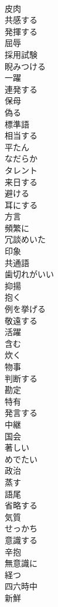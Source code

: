 \documentclass[8pt]{extreport}
\begin{document}
\begin{CJK}{UTF8}{min}
\\	皮肉
\\	共感する
\\	発揮する
\\	屈辱
\\	採用試験
\\	睨みつける
\\	一躍
\\	連発する
\\	保母
\\	偽る
\\	標準語
\\	相当する
\\	平たん
\\	なだらか
\\	タレント
\\	来日する
\\	避ける
\\	耳にする
\\	方言
\\	頻繁に
\\	冗談めいた
\\	印象
\\	共通語
\\	歯切れがいい
\\	抑揚
\\	抱く
\\	例を挙げる
\\	敬遠する
\\	活躍
\\	含む
\\	炊く
\\	物事
\\	判断する
\\	勘定
\\	特有
\\	発言する
\\	中継
\\	国会
\\	著しい
\\	めでたい
\\	政治
\\	蒸す
\\	語尾
\\	省略する
\\	気質
\\	せっかち
\\	意識する
\\	辛抱
\\	無意識に
\\	経つ
\\	四六時中
\\	新鮮

\end{CJK}
\end{document}
